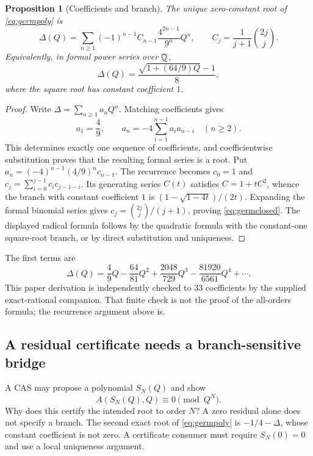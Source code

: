 \documentclass[11pt,a4paper]{article}
\theoremstyle{plain}
\newtheorem{proposition}[theorem]{Proposition}
\theoremstyle{definition}
\theoremstyle{remark}
\begin{document}
\begin{proposition}[Coefficients and branch]\label{prop:germcoeff}
The unique zero-constant root of \eqref{eq:germpoly} is
\begin{equation}\label{eq:germclosed}
 \Delta(Q)=\sum_{n\ge1}(-1)^{n-1}C_{n-1}\frac{4^{2n-1}}{9^n}Q^n,
 \qquad C_j=\frac{1}{j+1}\binom{2j}{j}.
\end{equation}
Equivalently, in formal power series over $\mathbb Q$,
\[
 \Delta(Q)=\frac{\sqrt{1+(64/9)Q}-1}{8},
\]
where the square root has constant coefficient $1$.
\end{proposition}
\begin{proof}
Write $\Delta=\sum_{n\ge1}a_nQ^n$. Matching coefficients gives
\[
 a_1=\frac49,\qquad
 a_n=-4\sum_{i=1}^{n-1}a_i a_{n-i}\quad(n\ge2).
\]
This determines exactly one sequence of coefficients, and coefficientwise substitution proves that the resulting formal series is a root. Put $a_n=(-4)^{n-1}(4/9)^n c_{n-1}$. The recurrence becomes $c_0=1$ and $c_j=\sum_{i=0}^{j-1}c_i c_{j-1-i}$. Its generating series $C(t)$ satisfies $C=1+tC^2$, whence the branch with constant coefficient $1$ is $(1-\sqrt{1-4t})/(2t)$. Expanding the formal binomial series gives $c_j=\binom{2j}{j}/(j+1)$, proving \eqref{eq:germclosed}. The displayed radical formula follows by the quadratic formula with the constant-one square-root branch, or by direct substitution and uniqueness.
\end{proof}
The first terms are
\[
 \Delta(Q)=\frac49Q-\frac{64}{81}Q^2+
 \frac{2048}{729}Q^3-\frac{81920}{6561}Q^4+\cdots.
\]
This paper derivation is independently checked to 33 coefficients by the supplied exact-rational companion. That finite check is not the proof of the all-orders formula; the recurrence argument above is.

\subsection{A residual certificate needs a branch-sensitive bridge}
A CAS may propose a polynomial $S_N(Q)$ and show
\[
 A(S_N(Q),Q)\equiv0\pmod{Q^N}.
\]
Why does this certify the intended root to order $N$? A zero residual alone does not specify a branch. The second exact root of \eqref{eq:germpoly} is $-1/4-\Delta$, whose constant coefficient is not zero. A certificate consumer must require $S_N(0)=0$ and use a local uniqueness argument.
\end{document}
